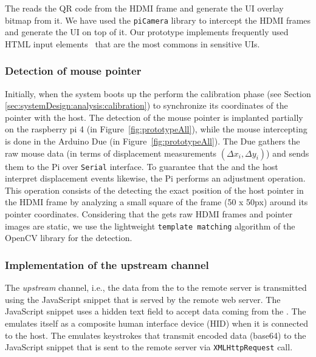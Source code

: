 The \device reads the QR code from the HDMI frame and generate the UI overlay bitmap from it. We have used the \texttt{piCamera} library to intercept the HDMI frames and generate the UI on top of it. Our \name prototype implements frequently used HTML input elements~\cite{html_elements} that are the most commons in sensitive UIs. 

\subsubsection{\bfseries Detection of mouse pointer}
\label{sec:prototype:impl:mouse}

Initially, when the system boots up the \device perform the calibration phase (see Section \ref{sec:systemDesign:analysis:calibration}) to synchronize its coordinates of the pointer with the host. The detection of the mouse pointer is implanted partially on the raspberry pi 4 (\six in Figure~\ref{fig:prototypeAll}), while the mouse intercepting is done in the Arduino Due (\three in Figure~\ref{fig:prototypeAll}). The Due gathers the raw mouse data (in terms of displacement measurements $(\Delta x_i, \Delta y_i)$) and sends them to the Pi over \texttt{Serial} interface.  To guarantee that the \device and the host interpret displacement events likewise, the Pi performs an adjustment operation. This operation consists of the \device detecting the exact position of the host pointer in the HDMI frame by analyzing a small square of the frame (50 x 50px) around its pointer coordinates. Considering that the \device gets raw HDMI frames and pointer images are static, we use the lightweight \texttt{template matching} algorithm of the OpenCV library for the detection.

\subsubsection{\bfseries Implementation of the upstream channel}
\label{sec:prototype:impl:upstream}

 The \emph{upstream} channel, i.e., the data from the \device to the remote server is transmitted using the \name JavaScript snippet that is served by the remote web server. The \name JavaScript snippet uses a hidden text field to accept data coming from the \device. The \device emulates itself as a composite human interface device (HID) when it is connected to the host. The \device emulates keystrokes that transmit encoded data (base64) to the \name JavaScript snippet that is sent to the remote server via \texttt{XMLHttpRequest} call.

